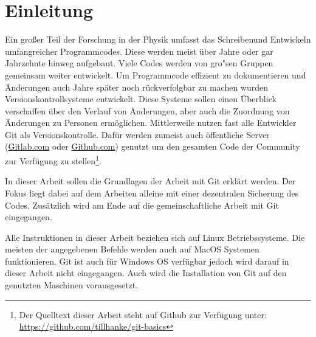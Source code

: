 \section{Einleitung}
Ein großer Teil der Forschung in der Physik umfasst das Schreibenund Entwickeln umfangreicher Programmcodes. Diese werden meist über Jahre oder gar Jahrzehnte hinweg aufgebaut. Viele Codes werden von gro"sen Gruppen gemeinsam weiter entwickelt. Um Programmcode effizient zu dokumentieren und Änderungen auch Jahre später noch rückverfolgbar zu machen wurden Versionskontrollsysteme entwickelt. Diese Systeme sollen einen Überblick verschaffen über den Verlauf von Änderungen, aber auch die Zuordnung von Änderungen zu Personen ermöglichen. Mittlerweile nutzen fast alle Entwickler Git als Versionskontrolle. Dafür werden zumeist auch öffentliche Server (\url{Gitlab.com} oder \url{Github.com}) genutzt um den gesamten Code der Community zur Verfügung zu stellen\footnote{Der Quelltext dieser Arbeit steht auf Github zur Verfügung unter: {\url{https://github.com/tillhanke/git-basics}}}.

In dieser Arbeit sollen die Grundlagen der Arbeit mit Git erklärt werden. Der Fokus liegt dabei auf dem Arbeiten alleine mit einer dezentralen Sicherung des Codes. Zusätzlich wird am Ende auf die gemeinschaftliche Arbeit mit Git eingegangen.

Alle Instruktionen in dieser Arbeit beziehen sich auf Linux Betriebssysteme. Die meisten der angegebenen Befehle werden auch auf MacOS Systemen funktionieren. Git ist auch für Windows OS verfügbar jedoch wird darauf in dieser Arbeit nicht eingegangen. Auch wird die Installation von Git auf den genutzten Maschinen vorausgesetzt.

